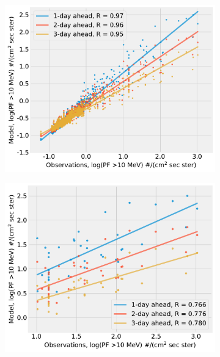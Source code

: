 \begin{figure}[!htp]
    \centering
    \begin{subfigure}{0.4\textwidth}
         \centering
         \includegraphics[width=\textwidth]{chapter4/figs/scatterplot_obs_vs_model_tstset_3in1_log_PF10.pdf}
    \end{subfigure}
    \begin{subfigure}{0.4\textwidth}
         \centering
         \includegraphics[width=\textwidth]{chapter4/figs/scatterplot_obs_vs_model_tstset_3in1_LOG_PF_LT1_log_PF10.pdf}
    \end{subfigure}

\end{figure}
